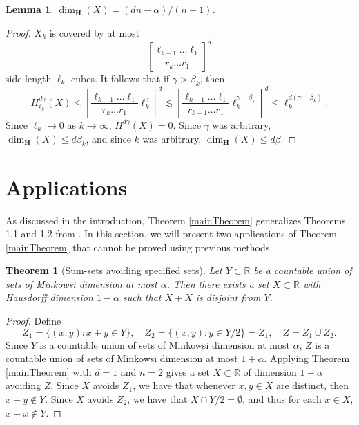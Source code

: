\documentclass[usenames,dvipsnames,letterpaper, reqno,11pt]{article}
\theoremstyle{plain}
\newtheorem{lemma}{Lemma}
\theoremstyle{plain}
\newtheorem{theorem}{Theorem}
\newcommand{\RR}{\mathbb{R}}
\begin{document}
\begin{lemma}
	$\dim_{\mathbf{H}}(X) = (dn - \alpha)/(n-1)$.
\end{lemma}
\begin{proof}
	$X_k$ is covered by at most
	\[ \left[ \frac{\ell_{k-1} \dots \ell_1}{r_k \dots r_1} \right]^d \]
	side length $\ell_k$ cubes. It follows that if $\gamma > \beta_k$, then
	\[ H^{d\gamma}_{\ell_k}(X) \leq \left[ \frac{\ell_{k-1} \dots \ell_1}{r_k \dots r_1} \ell_k^\gamma \right]^d \lesssim \left[ \frac{\ell_{k-1} \dots \ell_1}{r_{k-1} \dots r_1} \ell_k^{\gamma - \beta_k} \right]^d \leq \ell_k^{d(\gamma - \beta_k)}. \]
	Since $\ell_k \to 0$ as $k \to \infty$, $H^{d \gamma}(X) = 0$. Since $\gamma$ was arbitrary, $\dim_{\mathbf{H}}(X) \leq d \beta_k$, and since $k$ was arbitrary, $\dim_{\mathbf{H}}(X) \leq d \beta$.
\end{proof}


\section{Applications}\label{applicationsSection}
As discussed in the introduction, Theorem \ref{mainTheorem} generalizes Theorems 1.1 and 1.2 from \cite{MalabikaRob}. In this section, we will present two applications of Theorem \ref{mainTheorem} that cannot be proved using previous methods. 

\begin{theorem}[Sum-sets avoiding specified sets]
	Let $Y \subset \RR$ be a countable union of sets of Minkowsi dimension at most $\alpha$. Then there exists a set $X\subset \RR$ with Hausdorff dimension $1-\alpha$ such that $X + X$ is disjoint from $Y$.
\end{theorem}
\begin{proof}
	Define
	\[ Z_1 = \{ (x,y): x + y \in Y \},\quad Z_2 = \{ (x,y): y \in Y/2 \} = Z_1,\quad Z = Z_1\cup Z_2. \]
	Since $Y$ is a countable union of sets of Minkowsi dimension at most $\alpha$, $Z$ is a countable union of sets of Minkowsi dimension at most $1+\alpha$. Applying Theorem \ref{mainTheorem} with $d=1$ and $n = 2$ gives a set $X\subset\RR$ of dimension $1 - \alpha$ avoiding $Z$. Since $X$ avoids $Z_1$, we have that whenever $x,y\in X$ are distinct, then $x + y \not \in Y$. Since $X$ avoids $Z_2$, we have that $X \cap Y/2=\emptyset$, and thus for each $x\in X$, $x+x\not\in Y$.
\end{proof}
\end{document}
